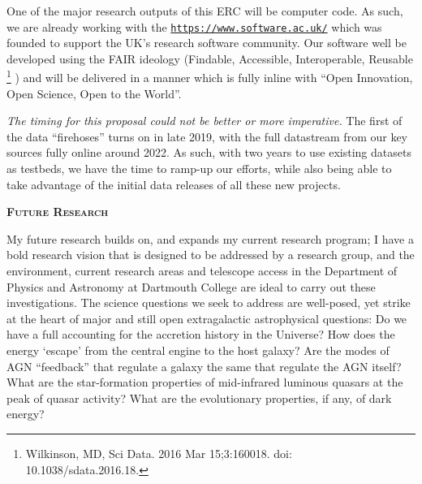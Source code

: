 \documentclass[oneside, a4paper, onecolumn, 11pt]{article}
\begin{document}
\smallskip
\smallskip
\noindent
One of the major research outputs 
of this ERC will be computer code. 
As such, we are already working with the
\href{The Software Sustainability Institute}{\tt https://www.software.ac.uk/}
which was founded to support the UK’s research software community. 
Our software well be developed using the FAIR ideology (Findable, Accessible, Interoperable, Reusable
\footnote{Wilkinson, MD, Sci Data. 2016 Mar 15;3:160018. doi: 10.1038/sdata.2016.18.}
) 
and will be delivered in a manner which is fully inline 
with ``Open Innovation, Open Science, Open to the World''. 


{\it The timing for this proposal could not be better or more imperative.} 
The first of the data ``firehoses'' turns on in late 2019, with
the full datastream from our key sources fully online around 2022. 
As such, with two years to use existing datasets as testbeds, we 
have the time to ramp-up our efforts, while also being able to 
take advantage of the initial data releases of all these new projects. 





\newpage

\medskip\medskip
\noindent
{\bfseries \large \textsc{\textcolor{Cerulean}{Future Research}}}

\smallskip
\smallskip
\noindent
My future research builds on, and expands my current research program;
I have a bold research vision that is designed to be addressed by a
research group, and the environment, current research areas and
telescope access in the Department of Physics and Astronomy at Dartmouth College
are ideal to
carry out these investigations.
The science questions we seek to address are well-posed, yet strike at
the heart of major and still open extragalactic astrophysical
questions: Do we have a full accounting for the accretion history in
the Universe?  How does the energy `escape' from the central engine to
the host galaxy?  Are the modes of AGN ``feedback'' that regulate a
galaxy the same that regulate the AGN itself?  What are the
star-formation properties of mid-infrared luminous quasars at the peak
of quasar activity?  What are the evolutionary properties, if any, of
dark energy?
\end{document}
